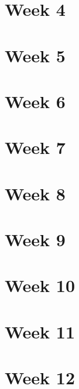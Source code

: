 \section{Week 4}



\section{Week 5}



\section{Week 6}



\section{Week 7}



\section{Week 8}



\section{Week 9}



\section{Week 10}



\section{Week 11}



\section{Week 12}

